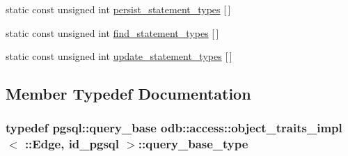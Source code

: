 \begin{DoxyCompactItemize}
\item 
static const unsigned int \hyperlink{classodb_1_1access_1_1object__traits__impl_3_01_1_1_edge_00_01id__pgsql_01_4_aa06794a964cee04bea5c469ffebe0fc3}{persist\+\_\+statement\+\_\+types} \mbox{[}$\,$\mbox{]}
\item 
static const unsigned int \hyperlink{classodb_1_1access_1_1object__traits__impl_3_01_1_1_edge_00_01id__pgsql_01_4_a9d36b44f43045130decbb630d1ea33a1}{find\+\_\+statement\+\_\+types} \mbox{[}$\,$\mbox{]}
\item 
static const unsigned int \hyperlink{classodb_1_1access_1_1object__traits__impl_3_01_1_1_edge_00_01id__pgsql_01_4_a153e1609cdb9b6a79192d81db412d15d}{update\+\_\+statement\+\_\+types} \mbox{[}$\,$\mbox{]}
\end{DoxyCompactItemize}


\subsection{Member Typedef Documentation}
\hypertarget{classodb_1_1access_1_1object__traits__impl_3_01_1_1_edge_00_01id__pgsql_01_4_a413670f4b9097cf3e8e84046f9523b53}{}
\subsubsection[{query\+\_\+base\+\_\+type}]{\setlength{\rightskip}{0pt plus 5cm}typedef pgsql\+::query\+\_\+base odb\+::access\+::object\+\_\+traits\+\_\+impl$<$ \+::{\bf Edge}, id\+\_\+pgsql $>$\+::{\bf query\+\_\+base\+\_\+type}}\label{classodb_1_1access_1_1object__traits__impl_3_01_1_1_edge_00_01id__pgsql_01_4_a413670f4b9097cf3e8e84046f9523b53}
\hypertarget{classodb_1_1access_1_1object__traits__impl_3_01_1_1_edge_00_01id__pgsql_01_4_ae542f808c89b666d052c8a7193b34b66}{}
